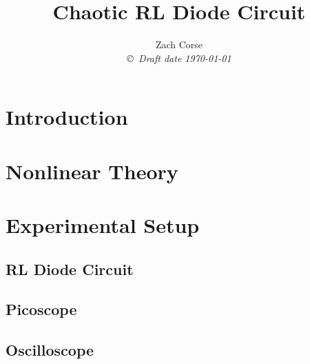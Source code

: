 \documentclass[12pt]{report}
\title{Chaotic RL Diode Circuit}
\author{Zach Corse  \\
{\small\em \copyright \  Draft date \today }}
\date{ }
\begin{document}



\tableofcontents
\listoffigures
\listoftables

\pagestyle{headings}

\pagestyle{plain}

\chapter{Introduction}



\chapter{Nonlinear Theory}



\chapter{Experimental Setup}

\section{RL Diode Circuit}
\label{sec:RL Diode Circuit}



\section{Picoscope}
\label{sec:Picoscope}


\section{Oscilloscope}
\label{sec:Oscilloscope}

\end{document}

